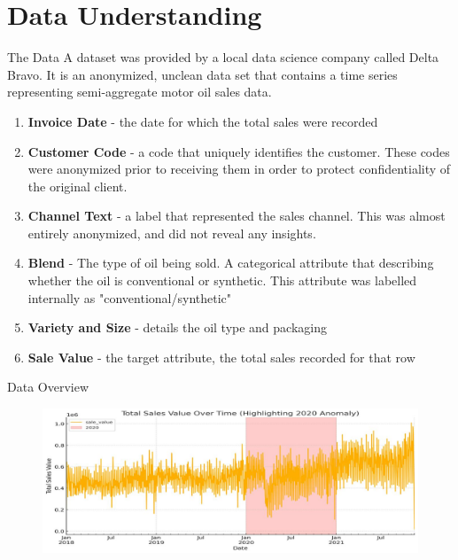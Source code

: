 \documentclass[9pt, dvipsnames]{beamer}
\begin{document}
\section{Data Understanding}
    \begin{frame}{The Data}
        A dataset was provided by a local data science company called Delta Bravo. It is an
        anonymized, unclean data set that contains a time series representing semi-aggregate
        motor oil sales data. \pause
        \begin{enumerate}
            \item \textbf{Invoice Date} - the date for which the total sales were recorded
            \item \textbf{Customer Code} - a code that uniquely identifies the customer. These codes
                were anonymized prior to receiving them in order to protect confidentiality
                of the original client.
            \item \textbf{Channel Text} - a label that represented the sales channel. This was almost
                entirely anonymized, and did not reveal any insights.
            \item \textbf{Blend} - The type of oil being sold. A categorical attribute that describing
                whether the oil is conventional or synthetic. This attribute was labelled internally
                as "conventional/synthetic"
            \item \textbf{Variety and Size} - details the oil type and packaging
            \item \textbf{Sale Value} - the target attribute, the total sales recorded for that row
        \end{enumerate}
    \end{frame}
    \begin{frame}{Data Overview}
        \begin{figure}
            \centering
            \includegraphics[height=0.42\paperheight]{assets/covid.jpg}
            \label{fig:covid}
        \end{figure}
    \end{frame}
\end{document}
